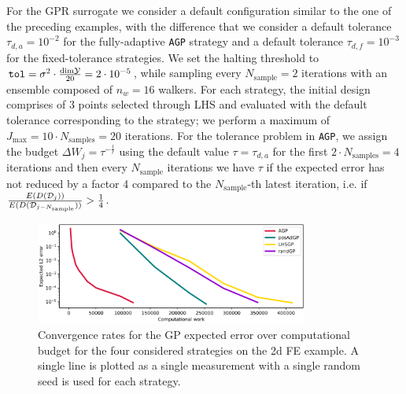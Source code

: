 For the GPR surrogate we consider a default configuration similar to the one of the preceding examples, with the difference that we consider a default tolerance $\tau_{d,a}= 10^{-2}$ for the fully-adaptive \texttt{AGP} strategy and a default tolerance $\tau_{d,f} = 10^{-3}$ for the fixed-tolerance strategies.
We set the halting threshold to $\texttt{tol} = \sigma^2 \cdot \frac{\text{dim} \mathcal Y }{20} = 2\cdot 10^{-5}$, while sampling every $N_{\text{sample}} = 2$ iterations with an ensemble composed of $n_w = 16$ walkers.
For each strategy, the initial design comprises of $3$ points selected through LHS and evaluated with the default tolerance corresponding to the strategy; we perform a maximum of $J_{\max} = 10 \cdot N_{\text{samples}} = 20 $ iterations.
For the tolerance problem in \texttt{AGP}, we assign the budget $\Delta W_j = \tau ^{-\frac{l}{r}}$ using the default value $\tau= \tau_{d,a}$ for the first $2\cdot N_{\text{samples}} = 4$ iterations and then every $N_{\text{sample}}$ iterations we have $\tau$ if the expected error has not reduced by a factor 4 compared to the $N_{\text{sample}}$-th latest iteration, i.e. if $\frac{E(D(\mathcal D_j))}{E(D(\mathcal D_{j-N_{\text{sample}}}))} > \frac{1}{4}$.\medskip

\begin{figure}[H]
    \begin{center}
        \includegraphics[width=0.8\textwidth]{results/pictures/d2/GP_res.png}
    \end{center}
    \caption{Convergence rates for the GP expected error over computational budget for the four considered strategies on the 2d FE example. A single line is plotted as a single measurement with a single random seed is used for each strategy.}
        \label{fig:FE-GP-convergence}
\end{figure}

